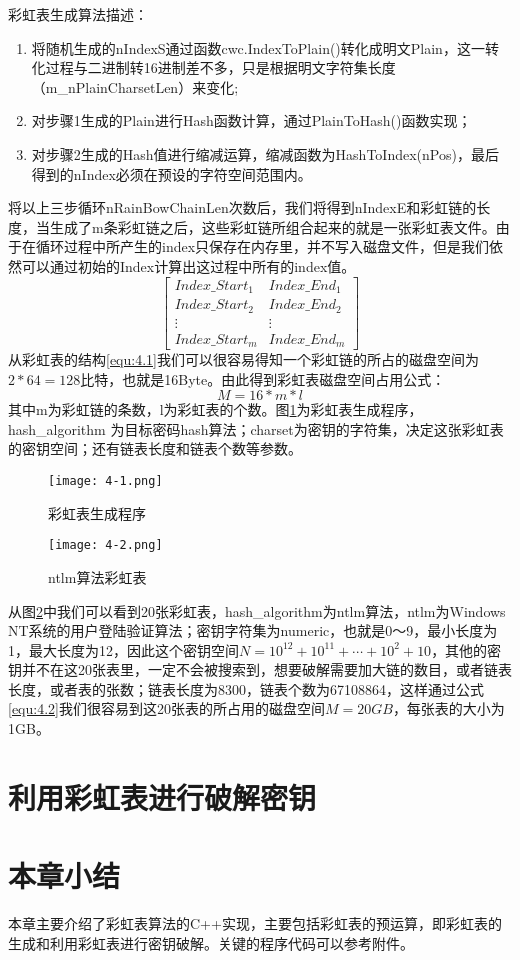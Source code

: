 彩虹表生成算法描述：
\begin{enumerate}
\item 将随机生成的nIndexS通过函数cwc.IndexToPlain()转化成明文Plain，这一转化过程与二进制转16进制差不多，只是根据明文字符集长度（m\_nPlainCharsetLen）来变化;
\item 对步骤1生成的Plain进行Hash函数计算，通过PlainToHash()函数实现；
\item 对步骤2生成的Hash值进行缩减运算，缩减函数为HashToIndex(nPos)，最后得到的nIndex必须在预设的字符空间范围内。
\end{enumerate}

将以上三步循环nRainBowChainLen次数后，我们将得到nIndexE和彩虹链的长度，当生成了m条彩虹链之后，这些彩虹链所组合起来的就是一张彩虹表文件。由于在循环过程中所产生的index只保存在内存里，并不写入磁盘文件，但是我们依然可以通过初始的Index计算出这过程中所有的index值。
\begin{equation}
\label{equ:4.1}
\begin{bmatrix}
Index\_Start_1 & Index\_End_1 \\
Index\_Start_2 & Index\_End_2 \\
\vdots  & \vdots \\
Index\_Start_m & Index\_End_m 
\end{bmatrix}
\end{equation}
从彩虹表的结构\eqref{equ:4.1}我们可以很容易得知一个彩虹链的所占的磁盘空间为$2*64=128$比特，也就是16Byte。由此得到彩虹表磁盘空间占用公式：
\begin{equation}
\label{equ:4.2}
M=16*m*l
\end{equation}
其中m为彩虹链的条数，l为彩虹表的个数。图\ref{fig:4.1}为彩虹表生成程序，hash\_algorithm 为目标密码hash算法；charset为密钥的字符集，决定这张彩虹表的密钥空间；还有链表长度和链表个数等参数。
\begin{figure}[!ht]
\centering
\texttt{[image: 4-1.png]}
\caption{彩虹表生成程序}
\label{fig:4.1}
\end{figure}

\begin{figure}[!ht]
\centering
\texttt{[image: 4-2.png]}
\caption{ntlm算法彩虹表}
\label{fig:4.2}
\end{figure}
从图\ref{fig:4.2}中我们可以看到20张彩虹表，hash\_algorithm为ntlm算法，ntlm为Windows NT系统的用户登陆验证算法；密钥字符集为numeric，也就是0～9，最小长度为1，最大长度为12，因此这个密钥空间$N=10^{12}+10^{11}+ \cdots +10^2 +10$，其他的密钥并不在这20张表里，一定不会被搜索到，想要破解需要加大链的数目，或者链表长度，或者表的张数；链表长度为8300，链表个数为67108864，这样通过公式\eqref{equ:4.2}我们很容易到这20张表的所占用的磁盘空间$M=20GB$，每张表的大小为1GB。
\section{利用彩虹表进行破解密钥}
\section{本章小结}
本章主要介绍了彩虹表算法的C++实现，主要包括彩虹表的预运算，即彩虹表的生成和利用彩虹表进行密钥破解。关键的程序代码可以参考附件。
